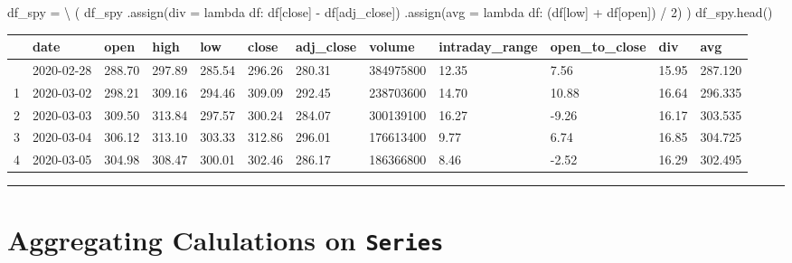 \documentclass[
  letterpaper,
  DIV=11,
  numbers=noendperiod]{scrreprt}
\newenvironment{Shaded}{\begin{snugshade}}{\end{snugshade}}
\newcommand{\DecValTok}[1]{\textcolor[rgb]{0.68,0.00,0.00}{#1}}
\newcommand{\KeywordTok}[1]{\textcolor[rgb]{0.00,0.23,0.31}{#1}}
\newcommand{\NormalTok}[1]{\textcolor[rgb]{0.00,0.23,0.31}{#1}}
\newcommand{\OperatorTok}[1]{\textcolor[rgb]{0.37,0.37,0.37}{#1}}
\newcommand{\StringTok}[1]{\textcolor[rgb]{0.13,0.47,0.30}{#1}}
\begin{document}
\begin{Shaded}
\begin{Highlighting}[]
\NormalTok{df\_spy }\OperatorTok{=} \OperatorTok{\textbackslash{}}
\NormalTok{    (}
\NormalTok{    df\_spy}
\NormalTok{        .assign(div }\OperatorTok{=} \KeywordTok{lambda}\NormalTok{ df: df[}\StringTok{\textquotesingle{}close\textquotesingle{}}\NormalTok{] }\OperatorTok{{-}}\NormalTok{ df[}\StringTok{\textquotesingle{}adj\_close\textquotesingle{}}\NormalTok{])}
\NormalTok{        .assign(avg }\OperatorTok{=} \KeywordTok{lambda}\NormalTok{ df: (df[}\StringTok{\textquotesingle{}low\textquotesingle{}}\NormalTok{] }\OperatorTok{+}\NormalTok{ df[}\StringTok{\textquotesingle{}open\textquotesingle{}}\NormalTok{]) }\OperatorTok{/} \DecValTok{2}\NormalTok{)}
\NormalTok{    )}
\NormalTok{df\_spy.head()}
\end{Highlighting}
\end{Shaded}

\begin{longtable}[]{@{}llllllllllll@{}}
\toprule\noalign{}
& date & open & high & low & close & adj\_close & volume &
intraday\_range & open\_to\_close & div & avg \\
\midrule\noalign{}
\endhead
\bottomrule\noalign{}
\endlastfoot
0 & 2020-02-28 & 288.70 & 297.89 & 285.54 & 296.26 & 280.31 & 384975800
& 12.35 & 7.56 & 15.95 & 287.120 \\
1 & 2020-03-02 & 298.21 & 309.16 & 294.46 & 309.09 & 292.45 & 238703600
& 14.70 & 10.88 & 16.64 & 296.335 \\
2 & 2020-03-03 & 309.50 & 313.84 & 297.57 & 300.24 & 284.07 & 300139100
& 16.27 & -9.26 & 16.17 & 303.535 \\
3 & 2020-03-04 & 306.12 & 313.10 & 303.33 & 312.86 & 296.01 & 176613400
& 9.77 & 6.74 & 16.85 & 304.725 \\
4 & 2020-03-05 & 304.98 & 308.47 & 300.01 & 302.46 & 286.17 & 186366800
& 8.46 & -2.52 & 16.29 & 302.495 \\
\end{longtable}

\begin{center}\rule{0.5\linewidth}{0.5pt}\end{center}

\hypertarget{aggregating-calulations-on-series}{%
\section{\texorpdfstring{Aggregating Calulations on
\texttt{Series}}{Aggregating Calulations on Series}}\label{aggregating-calulations-on-series}}
\end{document}
